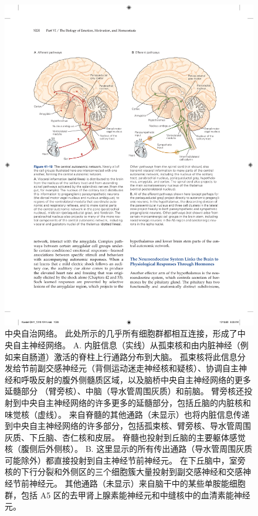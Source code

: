 \begin{figure}[htbp]
	\centering
	\includegraphics[width=0.95\linewidth]{chap41/fig_41_10}
	\caption{中央自治网络。 此处所示的几乎所有细胞群都相互连接，形成了中央自主神经网络。 A. 内脏信息（实线）从孤束核和由内脏神经（例如来自肠道）激活的脊柱上行通路分布到大脑。 孤束核将此信息分发给节前副交感神经元（背侧运动迷走神经核和疑核）、协调自主神经和呼吸反射的腹外侧髓质区域，以及脑桥中央自主神经网络的更多延髓部分 （臂旁核）、中脑（导水管周围灰质）和前脑。 臂旁核还投射到中央自主神经网络的许多更多的延髓部分，包括丘脑的内脏核和味觉核（虚线）。 来自脊髓的其他通路（未显示）也将内脏信息传递到中央自主神经网络的许多部分，包括孤束核、臂旁核、导水管周围灰质、下丘脑、杏仁核和皮层。 脊髓也投射到丘脑的主要躯体感觉核（腹侧后外侧核）。 B. 这里显示的所有传出通路（导水管周围灰质可能除外）都直接投射到自主神经节前神经元。 在下丘脑中，室旁核的下行分裂和外侧区的三个细胞簇大量投射到副交感神经和交感神经节前神经元。 其他通路（未显示）来自脑干中的某些单胺能细胞群，包括 A5 区的去甲肾上腺素能神经元和中缝核中的血清素能神经元。}
	\label{fig:41_10}
\end{figure}


